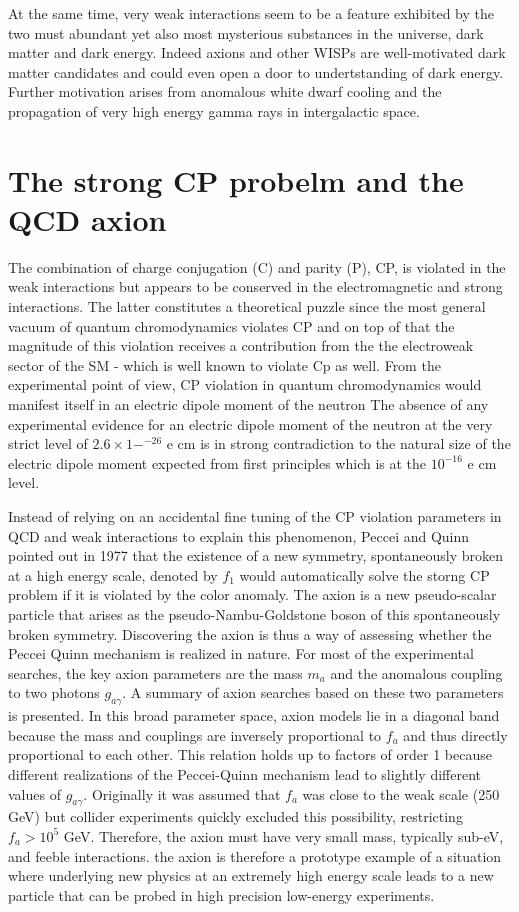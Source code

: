 \documentclass[11pt]{book}
\begin{document}
At the same time, very weak interactions seem to be a feature exhibited by the two must abundant yet also most mysterious substances in the universe, dark matter and dark energy. Indeed axions and other WISPs are well-motivated dark matter candidates and could even open a door to undertstanding of dark energy. Further motivation arises from anomalous white dwarf cooling and the propagation of very high energy gamma rays in intergalactic space.

\section{The strong CP probelm and the QCD axion}
The combination of charge conjugation (C) and parity (P), CP, is violated in the weak interactions but appears to be conserved in the electromagnetic and strong interactions. The latter constitutes a theoretical puzzle since the most general vacuum of quantum chromodynamics violates CP and on top of that the magnitude of this violation receives a contribution from the the electroweak sector of the SM - which is well known to violate Cp as well. From the experimental point of view, CP violation in quantum chromodynamics would manifest itself in an electric dipole moment of the neutron The absence of any experimental evidence for an electric dipole moment of the neutron at the very strict level of $2.6\times1-^{-26}$ e cm is in strong contradiction to the natural size of the electric dipole moment expected from first principles which is at the $10^{-16}$ e cm level.

Instead of relying on an accidental fine tuning of the CP violation parameters in QCD and weak interactions to explain this phenomenon, Peccei and Quinn pointed out in  1977 that the existence of a new symmetry, spontaneously broken at a high energy scale, denoted by $f_1$ would automatically solve the storng CP problem if it is violated by the color anomaly. The axion is a new pseudo-scalar particle that arises as the pseudo-Nambu-Goldstone boson of this spontaneously broken symmetry. Discovering the axion is thus a way of assessing whether the Peccei Quinn mechanism is realized in nature. For most of the experimental searches, the key axion parameters are the mass $m_a$ and the anomalous coupling to two photons $g_{a\gamma}$. A summary of axion searches based on these two parameters is presented. In this broad parameter space, axion models lie in a diagonal band because the mass and couplings are inversely proportional to $f_a$ and thus directly proportional to each other. This relation holds up to factors of order 1 because different realizations of the Peccei-Quinn mechanism lead to slightly different values of $g_{a\gamma}$.
Originally it was assumed that $f_a$ was close to the weak scale (250 GeV) but collider experiments quickly excluded this possibility, restricting $f_a > 10^5$ GeV. Therefore, the axion must have very small mass, typically sub-eV, and feeble interactions. the axion is therefore a prototype example of a situation where underlying new physics at an extremely high energy scale leads to a new particle that can be probed in high precision low-energy experiments.
\end{document}
